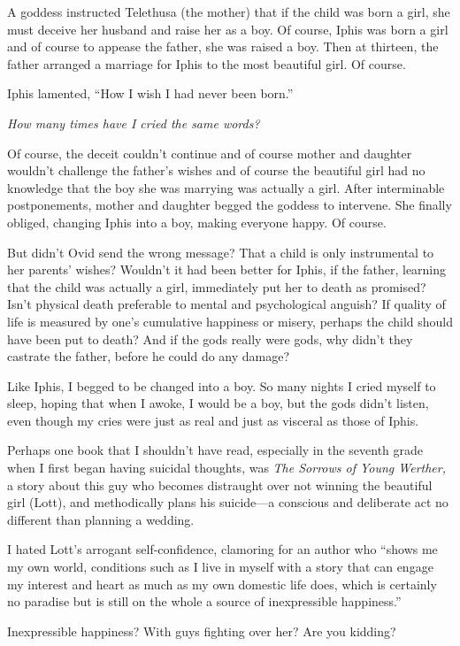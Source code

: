 A goddess instructed Telethusa (the mother) that if the child was born a
girl, she must deceive her husband and raise her as a boy. Of course,
Iphis was born a girl and of course to appease the father, she was
raised a boy. Then at thirteen, the father arranged a marriage for Iphis
to the most beautiful girl. Of course.

Iphis lamented, ``How I wish I had never been born.''

\emph{How many times have I cried the same words?}

Of course, the deceit couldn't continue and of course mother and
daughter wouldn't challenge the father's wishes and of course the
beautiful girl had no knowledge that the boy she was marrying was
actually a girl. After interminable postponements, mother and daughter
begged the goddess to intervene. She finally obliged, changing Iphis
into a boy, making everyone happy. Of course.

But didn't Ovid send the wrong message? That a child is only
instrumental to her parents' wishes? Wouldn't it had been better for
Iphis, if the father, learning that the child was actually a girl,
immediately put her to death as promised? Isn't physical death
preferable to mental and psychological anguish? If quality of life is
measured by one's cumulative happiness or misery, perhaps the child
should have been put to death? And if the gods really were gods, why
didn't they castrate the father, before he could do any damage?

Like Iphis, I begged to be changed into a boy. So many nights I cried
myself to sleep, hoping that when I awoke, I would be a boy, but the
gods didn't listen, even though my cries were just as real and just as
visceral as those of Iphis.

Perhaps one book that I shouldn't have read, especially in the seventh
grade when I first began having suicidal thoughts, was \emph{The Sorrows
of Young Werther,} a story about this guy who becomes distraught over
not winning the beautiful girl (Lott), and methodically plans his
suicide---a conscious and deliberate act no different than planning a
wedding.

I hated Lott's arrogant self-confidence, clamoring for an author who
``shows me my own world, conditions such as I live in myself with a
story that can engage my interest and heart as much as my own domestic
life does, which is certainly no paradise but is still on the whole a
source of inexpressible happiness.''

Inexpressible happiness? With guys fighting over her? Are you kidding?

